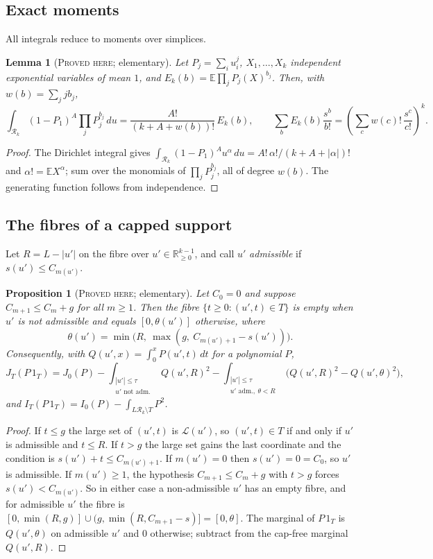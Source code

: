 \documentclass[11pt]{amsart}
\newtheorem{proposition}[theorem]{Proposition}
\newtheorem{lemma}[theorem]{Lemma}
\theoremstyle{definition}
\theoremstyle{remark}
\newcommand{\lbl}[1]{\textup{\textsc{#1}}}
\newcommand{\R}{\mathcal{R}}
\begin{document}
\subsection*{Exact moments}
All integrals reduce to moments over simplices.

\begin{lemma}[\lbl{Proved here}; elementary]\label{lem:egf}
Let $P_j=\sum_iu_i^j$, $X_1,\dots,X_k$ independent exponential variables of
mean $1$, and $E_k(b)=\mathbb E\prod_jP_j(X)^{b_j}$. Then, with
$w(b)=\sum_jjb_j$,
\[
\int_{\R_k}(1-P_1)^A\prod_jP_j^{b_j}\,du=\frac{A!}{(k+A+w(b))!}\,E_k(b),
\qquad
\sum_bE_k(b)\frac{s^b}{b!}=\left(\sum_c w(c)!\,\frac{s^c}{c!}\right)^{k}.
\]
\end{lemma}

\begin{proof}
The Dirichlet integral gives $\int_{\R_k}(1-P_1)^Au^\alpha\,du=A!\,\alpha!/(k+A+|\alpha|)!$
and $\alpha!=\mathbb EX^\alpha$; sum over the monomials of $\prod_jP_j^{b_j}$,
all of degree $w(b)$. The generating function follows from independence.
\end{proof}

\subsection*{The fibres of a capped support}
Let $R=L-|u'|$ on the fibre over $u'\in\mathbb R^{k-1}_{\ge0}$, and call $u'$
\emph{admissible} if $s(u')\le C_{m(u')}$.

\begin{proposition}[\lbl{Proved here}; elementary]\label{prop:fibre}
Let $C_0=0$ and suppose $C_{m+1}\le C_m+g$ for all $m\ge1$. Then the fibre
$\{t\ge0:(u',t)\in T\}$ is empty when $u'$ is not admissible and equals
$[0,\theta(u')]$ otherwise, where
\[
\theta(u')=\min\bigl(R,\ \max(g,\ C_{m(u')+1}-s(u'))\bigr).
\]
Consequently, with $Q(u',x)=\int_0^xP(u',t)\,dt$ for a polynomial $P$,
\[
J_T(P\,1_T)=J_0(P)-\int_{\substack{|u'|\le\tau\\ u'\text{ not adm.}}}Q(u',R)^2
-\int_{\substack{|u'|\le\tau\\ u'\text{ adm.},\ \theta<R}}\bigl(Q(u',R)^2-Q(u',\theta)^2\bigr),
\]
and $I_T(P\,1_T)=I_0(P)-\int_{L\R_k\setminus T}P^2$.
\end{proposition}

\begin{proof}
If $t\le g$ the large set of $(u',t)$ is $\mathcal L(u')$, so $(u',t)\in T$ if and only
if $u'$ is admissible and $t\le R$. If $t>g$ the large set gains the last
coordinate and the condition is $s(u')+t\le C_{m(u')+1}$. If $m(u')=0$ then
$s(u')=0=C_0$, so $u'$ is admissible. If $m(u')\ge1$, the hypothesis
$C_{m+1}\le C_m+g$ with $t>g$ forces $s(u')<C_{m(u')}$. So in either case a
non-admissible $u'$ has an empty fibre, and for admissible $u'$ the fibre is
$[0,\min(R,g)]\cup(g,\min(R,C_{m+1}-s)]=[0,\theta]$. The marginal of $P\,1_T$ is
$Q(u',\theta)$ on admissible $u'$ and $0$ otherwise; subtract from the cap-free
marginal $Q(u',R)$.
\end{proof}
\end{document}
